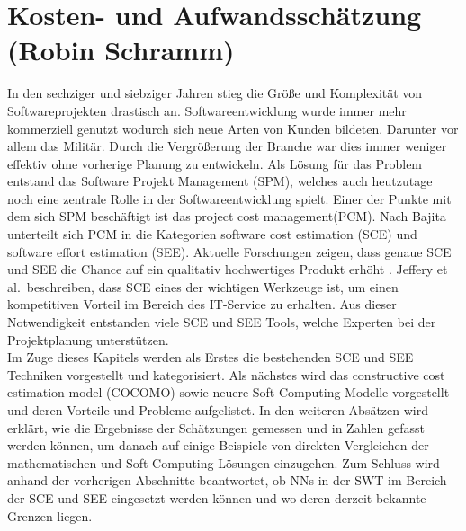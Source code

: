 \section{Kosten- und Aufwandsschätzung (Robin Schramm)} \label{KostenAufwand}
In den sechziger und siebziger Jahren stieg die Größe und Komplexität von Softwareprojekten drastisch an\cite{Bajta2018}. Softwareentwicklung wurde immer mehr kommerziell genutzt wodurch sich neue Arten von Kunden bildeten. Darunter vor allem das Militär. Durch die Vergrößerung der Branche war dies immer weniger effektiv ohne vorherige Planung zu entwickeln. Als Lösung für das Problem entstand das Software Projekt Management (SPM), welches auch heutzutage noch eine zentrale Rolle in der Softwareentwicklung spielt\cite{Bajta2018}. Einer der Punkte mit dem sich SPM beschäftigt ist das project cost management(PCM). Nach Bajita\cite{Bajta2018} unterteilt sich PCM in die Kategorien software cost estimation (SCE) und software effort estimation (SEE). Aktuelle Forschungen zeigen, dass genaue SCE und SEE die Chance auf ein qualitativ hochwertiges Produkt erhöht \cite{Matson1994}\cite{Bilgaiyan2016}. Jeffery et al.~beschreiben, dass SCE eines der wichtigen Werkzeuge ist, um einen kompetitiven Vorteil im Bereich des IT-Service zu erhalten\cite{Jeffery1990}. Aus dieser Notwendigkeit entstanden viele SCE und SEE Tools, welche Experten bei der Projektplanung unterstützen.
\\
Im Zuge dieses Kapitels werden als Erstes die bestehenden SCE und SEE Techniken vorgestellt und kategorisiert. Als nächstes wird das constructive cost estimation model (COCOMO) sowie neuere Soft-Computing Modelle vorgestellt und deren Vorteile und Probleme aufgelistet. In den weiteren Absätzen wird erklärt, wie die Ergebnisse der Schätzungen gemessen und in Zahlen  gefasst werden können, um danach auf einige Beispiele von direkten Vergleichen der mathematischen und Soft-Computing Lösungen einzugehen. Zum Schluss wird anhand der vorherigen Abschnitte beantwortet, ob NNs in der SWT im Bereich der SCE und SEE eingesetzt werden können und wo deren derzeit bekannte Grenzen liegen.


